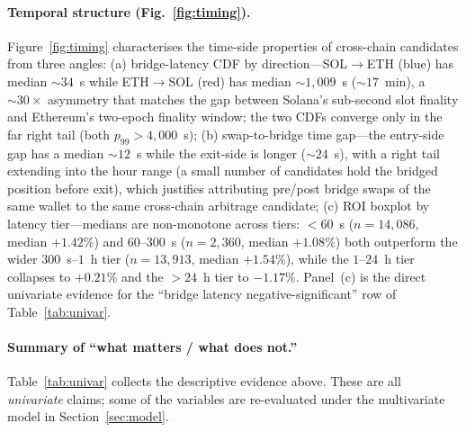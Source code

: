 \documentclass[sigconf,nonacm,10pt]{acmart}
\begin{document}
\paragraph{Temporal structure (Fig.~\ref{fig:timing}).}
Figure~\ref{fig:timing} characterises the time-side properties of
cross-chain candidates from three angles:
(a) bridge-latency CDF by direction---SOL$\to$ETH (blue) has
median $\sim\!34$~s while ETH$\to$SOL (red) has median
$\sim\!1{,}009$~s ($\sim\!17$~min), a $\sim\!30\times$ asymmetry
that matches the gap between Solana's sub-second slot finality and
Ethereum's two-epoch finality window; the two CDFs converge only in
the far right tail (both $p_{99}\!>\!4{,}000$~s);
(b) swap-to-bridge time gap---the entry-side gap has a median
$\sim\!12$~s while the exit-side is longer ($\sim\!24$~s), with a
right tail extending into the hour range (a small number of
candidates hold the bridged position before exit), which justifies
attributing pre/post bridge swaps of the same wallet to the same
cross-chain arbitrage candidate;
(c) ROI boxplot by latency tier---medians are non-monotone across
tiers: $<\!60$~s ($n=14{,}086$, median $+1.42\%$) and
$60$--$300$~s ($n=2{,}360$, median $+1.08\%$) both outperform the
wider $300$~s--$1$~h tier ($n=13{,}913$, median $+1.54\%$), while
the $1$--$24$~h tier collapses to $+0.21\%$ and the $>\!24$~h tier
to $-1.17\%$. Panel~(c) is the direct univariate evidence for the
``bridge latency negative-significant'' row of
Table~\ref{tab:univar}.

\paragraph{Summary of ``what matters / what does not.''}
Table~\ref{tab:univar} collects the descriptive evidence above. These
are all \emph{univariate} claims; some of the variables are
re-evaluated under the multivariate model in
Section~\ref{sec:model}.
\end{document}
